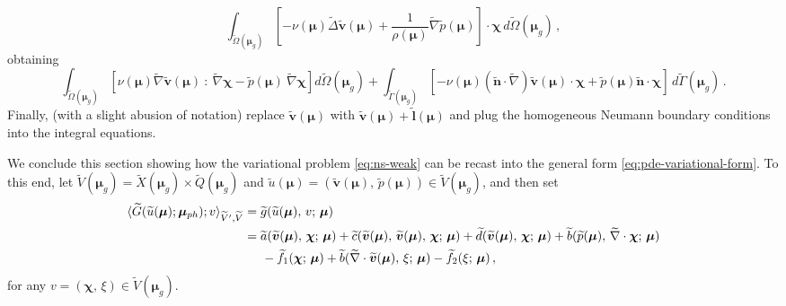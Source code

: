 \documentclass[12pt, a4paper, twoside, openright]{report}
\numberwithin{equation}{chapter}
\theoremstyle{theorem}
\theoremstyle{definition}
\theoremstyle{remark}
\theoremstyle{proposition}
\numberwithin{figure}{chapter}
\newcommand{\wt}[1]{\widetilde{#1}}
\newcommand{\bg}[1]{\boldsymbol{#1}}
\begin{document}
		\begin{equation*}
			\int_{\wt{\Omega}(\bg{\mu}_g)} \left[ - \nu(\bg{\mu}) \wt{\Delta} \wt{\bg{v}}(\bg{\mu}) + \dfrac{1}{\rho(\bg{\mu})} \wt{\nabla} \wt{p}(\bg{\mu}) \right] \cdot \bg{\chi} \, d\wt{\Omega}(\bg{\mu}_g) \, ,
		\end{equation*}
		obtaining
		\begin{equation*}
			\int_{\wt{\Omega}(\bg{\mu}_g)} \left[ \nu(\bg{\mu}) \wt{\nabla} \wt{\bg{v}}(\bg{\mu}) ~ : ~ \wt{\nabla} \bg{\chi} - \wt{p}(\bg{\mu}) ~ \wt{\nabla} \bg{\chi} \right] d\wt{\Omega}(\bg{\mu}_g) + \int_{\wt{\Gamma}(\bg{\mu}_g)} \left[ - \nu(\bg{\mu}) \left( \wt{\bg{n}} \cdot \wt{\nabla} \right) \wt{\bg{v}}(\bg{\mu}) \cdot \bg{\chi} + \wt{p}(\bg{\mu}) \wt{\bg{n}} \cdot \bg{\chi} \right] \, d\wt{\Gamma}(\bg{\mu}_g) \, .
		\end{equation*}
		Finally, (with a slight abusion of notation) replace $\wt{\bg{v}}(\bg{\mu})$ with $\wt{\bg{v}}(\bg{\mu}) + \wt{\bg{l}}(\bg{\mu})$ and plug the homogeneous Neumann boundary conditions into the integral equations.
		
		We conclude this section showing how the variational problem \eqref{eq:ns-weak} can be recast into the general form \eqref{eq:pde-variational-form}. To this end, let $\wt{V}(\bg{\mu}_g) = \wt{X}(\bg{\mu}_g) \times \wt{Q}(\bg{\mu}_g)$ and $\wt{u}(\bg{\mu}) = (\wt{\bg{v}}(\bg{\mu}), \, \wt{p}(\bg{\mu})) \in \wt{V}(\bg{\mu}_g)$, and then set
		\begin{equation*}
			\begin{aligned}
				\langle \wt{G}(\wt{u}(\bg{\mu}); \bg{\mu}_{ph}); v \rangle_{\wt{V}',\wt{V}} & = \wt{g}(\wt{u}(\bg{\mu}), \, v; \, \bg{\mu}) \\
				& = \wt{a}(\wt{\bg{v}}(\bg{\mu}), \, \bg{\chi}; \, \bg{\mu}) + \wt{c}(\wt{\bg{v}}(\bg{\mu}), \, \wt{\bg{v}}(\bg{\mu}), \, \bg{\chi}; \, \bg{\mu}) + \wt{d}(\wt{\bg{v}}(\bg{\mu}), \, \bg{\chi}; \, \bg{\mu}) + \wt{b}(\wt{p}(\bg{\mu}), \, \wt{\nabla} \cdot \bg{\chi}; \, \bg{\mu}) \\
				& \hspace*{0.5cm} - \wt{f}_1(\bg{\chi}; \, \bg{\mu}) + \wt{b}(\wt{\nabla} \cdot \wt{\bg{v}}(\bg{\mu}), \, \xi; \, \bg{\mu}) - \wt{f}_2(\xi; \, \bg{\mu}) \, ,
			\end{aligned}
		\end{equation*}
		for any $v = (\bg{\chi}, \, \xi) \in \wt{V}(\bg{\mu}_g)$.
		
	\vspace*{0.3cm}
		
\end{document}

